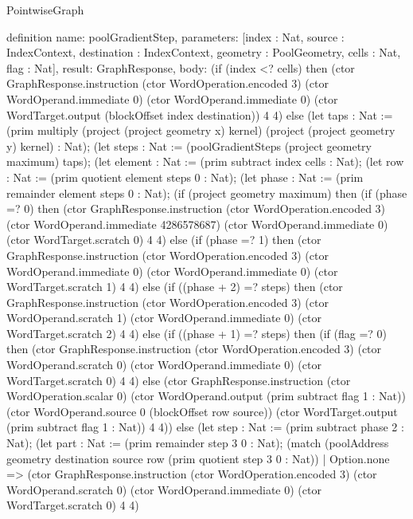 \begin{lexlean}{PointwiseGraph}
\begin{semanticmodule}
definition{
  name: poolGradientStep,
  parameters: [index : Nat, source : IndexContext, destination : IndexContext, geometry : PoolGeometry, cells : Nat, flag : Nat],
  result: GraphResponse,
  body: (if (index <? cells) then (ctor GraphResponse.instruction (ctor WordOperation.encoded 3) (ctor WordOperand.immediate 0) (ctor WordOperand.immediate 0) (ctor WordTarget.output (blockOffset index destination)) 4 4) else (let taps : Nat := (prim multiply (project (project geometry x) kernel) (project (project geometry y) kernel) : Nat);
      (let steps : Nat := (poolGradientSteps (project geometry maximum) taps);
      (let element : Nat := (prim subtract index cells : Nat);
      (let row : Nat := (prim quotient element steps 0 : Nat);
      (let phase : Nat := (prim remainder element steps 0 : Nat);
      (if (project geometry maximum) then (if (phase =? 0) then (ctor GraphResponse.instruction (ctor WordOperation.encoded 3) (ctor WordOperand.immediate 4286578687) (ctor WordOperand.immediate 0) (ctor WordTarget.scratch 0) 4 4) else (if (phase =? 1) then (ctor GraphResponse.instruction (ctor WordOperation.encoded 3) (ctor WordOperand.immediate 0) (ctor WordOperand.immediate 0) (ctor WordTarget.scratch 1) 4 4) else (if ((phase + 2) =? steps) then (ctor GraphResponse.instruction (ctor WordOperation.encoded 3) (ctor WordOperand.scratch 1) (ctor WordOperand.immediate 0) (ctor WordTarget.scratch 2) 4 4) else (if ((phase + 1) =? steps) then (if (flag =? 0) then (ctor GraphResponse.instruction (ctor WordOperation.encoded 3) (ctor WordOperand.scratch 0) (ctor WordOperand.immediate 0) (ctor WordTarget.scratch 0) 4 4) else (ctor GraphResponse.instruction (ctor WordOperation.scalar 0) (ctor WordOperand.output (prim subtract flag 1 : Nat)) (ctor WordOperand.source 0 (blockOffset row source)) (ctor WordTarget.output (prim subtract flag 1 : Nat)) 4 4)) else (let step : Nat := (prim subtract phase 2 : Nat);
      (let part : Nat := (prim remainder step 3 0 : Nat);
      (match (poolAddress geometry destination source row (prim quotient step 3 0 : Nat))
        | Option.none => (ctor GraphResponse.instruction (ctor WordOperation.encoded 3) (ctor WordOperand.scratch 0) (ctor WordOperand.immediate 0) (ctor WordTarget.scratch 0) 4 4)
}
\end{semanticmodule}
\end{lexlean}
